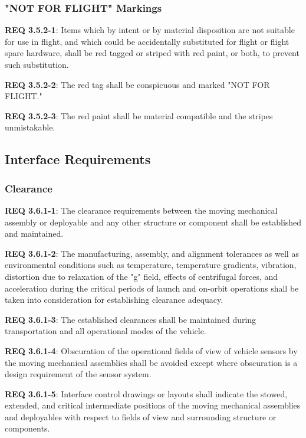 \documentclass[12pt]{article}
\begin{document}
\subsubsection{"NOT FOR FLIGHT" Markings} %
\noindent \textbf{REQ 3.5.2-1}: Items which by intent or by material disposition are not suitable for use in flight, and which could be accidentally substituted for flight or flight spare hardware, shall be red tagged or striped with red paint, or both, to prevent such substitution. 

\noindent \textbf{REQ 3.5.2-2}: The red tag shall be conspicuous and marked "NOT FOR FLIGHT."

\noindent \textbf{REQ 3.5.2-3}: The red paint shall be material compatible and the stripes unmistakable.


\clearpage
\subsection{Interface Requirements} %
\subsubsection{Clearance} %
\noindent \textbf{REQ 3.6.1-1}: The clearance requirements between the moving mechanical assembly or deployable and any other structure or component shall be established and maintained. 

\noindent \textbf{REQ 3.6.1-2}: The manufacturing, assembly, and alignment tolerances as well as environmental conditions such as temperature, temperature gradients, vibration, distortion due to relaxation of the "g" field, effects of centrifugal forces, and acceleration during the critical periods of launch and on-orbit operations shall be taken into consideration for establishing clearance adequacy.

\noindent \textbf{REQ 3.6.1-3}: The established clearances shall be maintained during transportation and all operational modes of the vehicle.

\noindent \textbf{REQ 3.6.1-4}: Obscuration of the operational fields of view of vehicle sensors by the moving mechanical assemblies shall be avoided except where obscuration is a design requirement of the sensor system.

\noindent \textbf{REQ 3.6.1-5}: Interface control drawings or layouts shall indicate the stowed, extended, and critical intermediate positions of the moving mechanical assemblies and deployables with respect to fields of view and surrounding structure or components.
\end{document}
